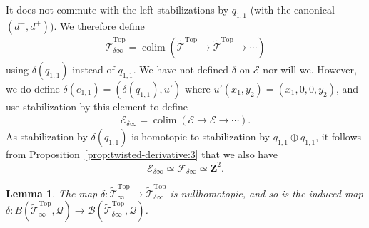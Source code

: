 \documentclass[reqno]{amsart}
\theoremstyle{theorem}
\newtheorem{lemma}[corollary]{Lemma}
\theoremstyle{remark}
\theoremstyle{definition}
\DeclareMathOperator*{\colim}{colim}
\newcommand{\FF}{\mathcal{F}}
\newcommand{\E}{\mathcal{E}}
\newcommand{\B}{\mathcal{B}}
\newcommand{\Z}{\mathbf{Z}}
\newcommand{\TT}{\widetilde{\mathcal{T}}}
\newcommand{\QQ}{\mathcal{Q}}
\newcommand{\TOP}{\mathrm{Top}}
\begin{document}
It does not commute with the left stabilizations by $q_{1,1}$ (with the canonical $(d^-,d^+)$). We therefore define
\begin{align*}
  \TT^\TOP_{\delta\infty} = \colim(\TT^\TOP \to \TT^\TOP \to \cdots)
\end{align*}
using $\delta(q_{1,1})$ instead of $q_{1,1}$. We have not defined $\delta$ on $\E$ nor will we. However, we do define $\delta(e_{1,1}) = (\delta(q_{1,1}),u')$ where $u'(x_1,y_2) = (x_1,0,0,y_2)$, and use stabilization by this element to define
\begin{align*}
  \E_{\delta \infty} = \colim(\E \to \E \to \cdots).
\end{align*}
As stabilization by $\delta(q_{1,1})$ is homotopic to stabilization by $q_{1,1} \oplus q_{1,1}$, it follows from Proposition~\ref{prop:twisted-derivative:3} that 
we also have
\[\E_{\delta \infty} \simeq \FF_{\delta \infty} \simeq \Z^2.\]


\begin{lemma}\label{lem:deltanull}
  The map $\delta : \TT_\infty^\TOP\to \TT_{\delta \infty}^\TOP$ is nullhomotopic, and so is the induced map $\delta :B(\TT_\infty^\TOP,\QQ) \to \B(\TT_{\delta \infty}^\TOP,\QQ)$.
\end{lemma}
\end{document}
